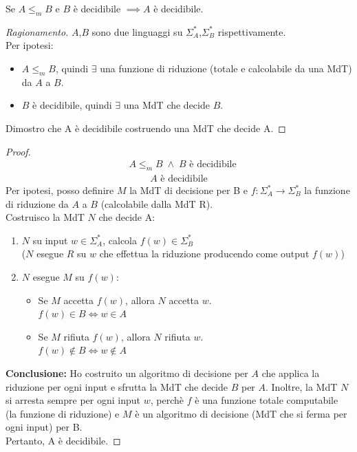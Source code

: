 \documentclass{article}  %
\theoremstyle{definition}
\newenvironment{ragionamento}[1][]
  {\begin{proof}[Ragionamento#1]\renewcommand{\qedsymbol}{}\normalfont}
  {\end{proof}}
\begin{document}
\begin{esercizio}[Dimostrazione 3.1]
  \footnotesize %
  Se $A \leq_m B$ e $B$ è decidibile $\implies A$ è decidibile. 
  \begin{ragionamento}
    $A$,$B$ sono due linguaggi su $\Sigma^*_A$,$\Sigma^*_B$ rispettivamente. \\
    Per ipotesi: 
\begin{itemize}
  \item $A \leq_m B$, quindi $\exists$ una funzione di riduzione (totale e calcolabile da una MdT) da $A$ a $B$.
  \item $B$ è decidibile, quindi $\exists$ una MdT che decide $B$.
\end{itemize}
Dimostro che A è decidibile costruendo una MdT che decide A.
  \end{ragionamento}
  \begin{proof}
    \begin{align*}
  & A \leq_m B \;\wedge\; B \text{ è decidibile} \tag*{(ipotesi)}
\end{align*}
\begin{align*}
  A \text{ è decidibile} \tag*{(tesi)}
\end{align*}
Per ipotesi, posso definire $M$ la MdT di decisione per B e $f:\Sigma^*_A \rightarrow \Sigma^*_B$ la funzione di riduzione da $A$ a $B$ (calcolabile dalla MdT R). \\
Costruisco la MdT $N$ che decide A:
\begin{enumerate}
  \item $N$ su input $w \in \Sigma^*_A$, calcola $f(w) \in \Sigma^*_B$ \\
  ($N$ esegue $R$ su $w$ che effettua la riduzione producendo come output $f(w)$)
  \item $N$ esegue $M$ su $f(w)$:
  \begin{itemize}
    \item Se $M$ accetta $f(w)$, allora $N$ accetta $w$. \\
    $f(w) \in B \iff w \in A$
    \item Se $M$ rifiuta $f(w)$, allora $N$ rifiuta $w$.  \\
    $f(w) \notin B \iff w \notin A$ 
  \end{itemize}
\end{enumerate}
\textbf{{Conclusione:}} Ho costruito un algoritmo di decisione per $A$ che applica la riduzione per ogni input e sfrutta la MdT che 
decide $B$ per $A$. Inoltre, la MdT $N$ si arresta sempre per ogni input $w$, perchè $f$ è una funzione totale computabile 
(la funzione di riduzione) e $M$ è un algoritmo di decisione (MdT che si ferma per ogni input) per B.\\
Pertanto, A è decidibile.


\end{proof}
\end{esercizio}
\end{document}
